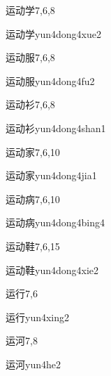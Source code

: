 \begin{entry}{运动学}{7,6,8}
  \begin{phonetics}{运动学}{yun4dong4xue2}
  \end{phonetics}
\end{entry}

\begin{entry}{运动服}{7,6,8}
  \begin{phonetics}{运动服}{yun4dong4fu2}
  \end{phonetics}
\end{entry}

\begin{entry}{运动衫}{7,6,8}
  \begin{phonetics}{运动衫}{yun4dong4shan1}
  \end{phonetics}
\end{entry}

\begin{entry}{运动家}{7,6,10}
  \begin{phonetics}{运动家}{yun4dong4jia1}
  \end{phonetics}
\end{entry}

\begin{entry}{运动病}{7,6,10}
  \begin{phonetics}{运动病}{yun4dong4bing4}
  \end{phonetics}
\end{entry}

\begin{entry}{运动鞋}{7,6,15}
  \begin{phonetics}{运动鞋}{yun4dong4xie2}
  \end{phonetics}
\end{entry}

\begin{entry}{运行}{7,6}
  \begin{phonetics}{运行}{yun4xing2}
  \end{phonetics}
\end{entry}

\begin{entry}{运河}{7,8}
  \begin{phonetics}{运河}{yun4he2}
  \end{phonetics}
\end{entry}


